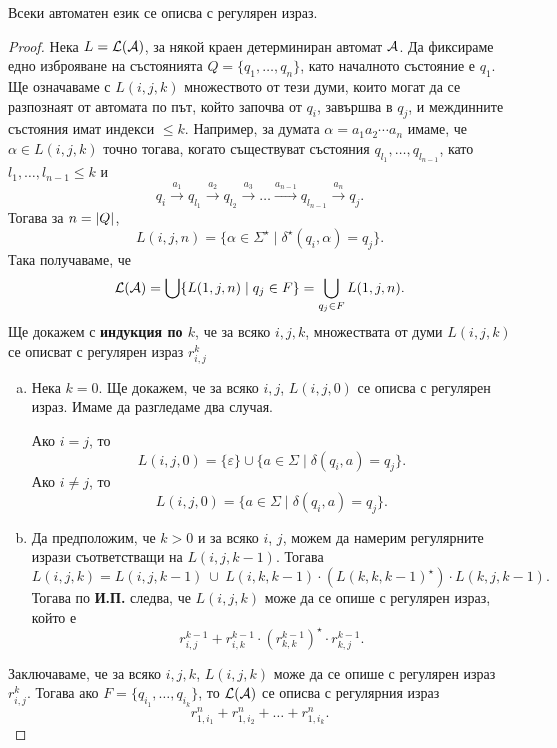 \begin{framed}
\begin{thm}[Клини]
  Всеки автоматен език се описва с регулярен израз.
\end{thm}
\end{framed}
\begin{proof}
  Нека  $L = \mathcal{L}(\mathcal{A})$, за някой краен детерминиран автомат $\mathcal{A}$.
  Да фиксираме едно изброяване на състоянията $Q = \{q_1,\dots,q_n\}$,
  като началното състояние е $q_1$.
  Ще означаваме с $L(i,j,k)$ множеството от тези думи, които
  могат да се разпознаят от автомата по път, който започва от $q_i$,
  завършва в $q_j$, и междинните състояния имат индекси $\leq k$.
  Например, за думата $\alpha = a_1a_2\cdots a_n$ имаме, че $\alpha \in L(i,j,k)$
  точно тогава, когато съществуват състояния $q_{l_1},\dots,q_{l_{n-1}}$, като $l_1,\dots,l_{n-1} \leq k$ и
  \[q_i\stackrel{a_1}{\rightarrow} q_{l_1} \stackrel{a_2}{\rightarrow} q_{l_2} \stackrel{a_3}{\rightarrow} \dots \stackrel{a_{n-1}}{\rightarrow} q_{l_{n-1}}\stackrel{a_n}{\rightarrow} q_j.\]
  Тогава за $n = \lvert{Q}\rvert$, 
  \[L(i,j,n) = \{\alpha\in\Sigma^\star\mid \delta^\star(q_i,\alpha) = q_j\}.\]
  Така получаваме, че 
  \[\mathcal{L}(\mathcal{A}) = \bigcup\{L(1,j,n)\mid q_j \in F\} = \bigcup_{q_j\in F}L(1,j,n).\]
  Ще докажем с {\bf индукция по $k$}, че за всяко $i,j,k$, множествата от думи $L(i,j,k)$
  се описват с регулярен израз $r^k_{i,j}$
  \begin{enumerate}[a)]
  \item
    Нека $k = 0$. Ще докажем, че за всяко $i,j$, $L(i,j,0)$ се описва с регулярен израз.
    Имаме да разгледаме два случая.
    
    Ако $i = j$, то 
    \[L(i, j, 0) = \{\varepsilon\}\cup\{a\in\Sigma \mid \delta(q_i,a) = q_j\}.\]
    Ако $i \neq j$, то
    \[L(i, j, 0) = \{a\in\Sigma \mid \delta(q_i, a) = q_j\}.\]
  \item
    Да предположим, че $k > 0$ и за всяко $i$, $j$, можем да намерим регулярните изрази
    съответстващи на $L(i,j,k-1)$. Тогава
    \[L(i,j,k) = L(i,j,k-1)\ \cup\ L(i,k,k-1)\cdot (L(k,k,k-1)^\star) \cdot L(k,j,k-1).\]
    Тогава по {\bf И.П.} следва, че $L(i,j,k)$ може да се опише с регулярен израз, който е
    \[r^{k-1}_{i,j} + r^{k-1}_{i,k}\cdot (r^{k-1}_{k,k})^\star\cdot r^{k-1}_{k,j}.\]
  \end{enumerate}
  Заключаваме, че за всяко $i,j,k$, $L(i,j,k)$ може да се опише с регулярен израз $r^{k}_{i,j}$.
  Тогава ако $F = \{q_{i_1},\dots,q_{i_k}\}$, то $\mathcal{L}(\mathcal{A})$ се описва с регулярния израз
  \[r^n_{1,i_1} + r^n_{1,i_2} + \dots + r^n_{1,i_k}.\]
\end{proof}

